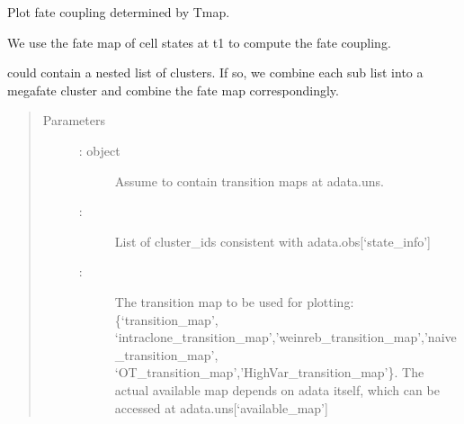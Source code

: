 \documentclass[letterpaper,10pt,english]{sphinxmanual}
\begin{document}
\begin{fulllineitems}
\label{\detokenize{cospar.pl.fate_coupling_from_Tmap:cospar.pl.fate_coupling_from_Tmap}}
Plot fate coupling determined by Tmap.

We use the fate map of cell states at t1 to compute the fate coupling.

 could contain a nested list of clusters. If so, we
combine each sub list into a mega\sphinxhyphen{}fate cluster and combine the fate
map correspondingly.
\begin{quote}\begin{description}
\item[{Parameters}] \leavevmode\begin{description}
\item[{ :  object}] \leavevmode
Assume to contain transition maps at adata.uns.

\item[{ : }] \leavevmode
List of cluster\_ids consistent with adata.obs{[}‘state\_info’{]}

\item[{ : }] \leavevmode
The transition map to be used for plotting: \{‘transition\_map’,
‘intraclone\_transition\_map’,’weinreb\_transition\_map’,’naive\_transition\_map’,
‘OT\_transition\_map’,’HighVar\_transition\_map’\}. The actual available
map depends on adata itself, which can be accessed at adata.uns{[}‘available\_map’{]}


\end{description}
\end{description}
\end{quote}
\end{fulllineitems}
\end{document}

